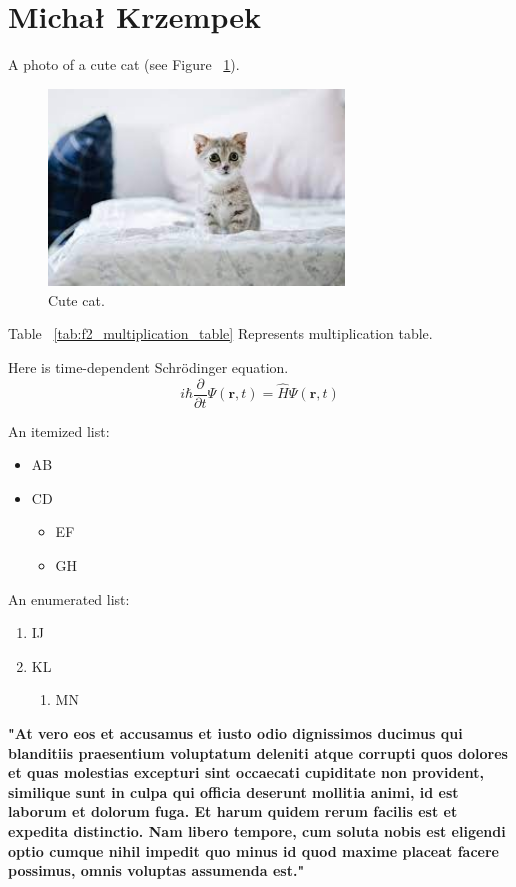 \section{Michał Krzempek}
\label{sec:michalkrzem}

A photo of a cute cat (see Figure ~\ref{fig:cat}).

\begin{figure}[htbp]
    \centering
    \includegraphics[width=0.7\textwidth]{pictures/cute_cat.jpg}
    \caption{Cute cat.}
    \label{fig:cat}
\end{figure}

Table ~\ref{tab:f2_multiplication_table} Represents multiplication table.



Here is time-dependent Schrödinger equation.
 \[i\hbar \frac{\partial}{\partial t}\Psi(\mathbf{r},t) = \hat H \Psi(\mathbf{r},t)\]

An itemized list:
\begin{itemize}
   \item AB
   \item CD
   \begin{itemize}
     \item EF
     \item GH
    \end{itemize}
\end{itemize}

An enumerated list:
\begin{enumerate}
   \item IJ
   \item KL
   \begin{enumerate}
     \item MN     
   \end{enumerate}
\end{enumerate}

\textbf{"At vero eos et accusamus et iusto odio dignissimos ducimus qui blanditiis praesentium voluptatum deleniti atque corrupti quos dolores et quas molestias excepturi sint occaecati cupiditate non provident, similique sunt in culpa qui officia deserunt mollitia animi, id est laborum et dolorum fuga. Et harum quidem rerum facilis est et expedita distinctio. Nam libero tempore, cum soluta nobis est eligendi optio cumque nihil impedit quo minus id quod maxime placeat facere possimus, omnis voluptas assumenda est."}

